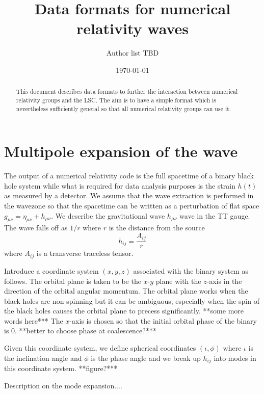 \documentclass[amsmath,amssymb]{article}
\begin{document}
\title{Data formats for numerical relativity waves}
\date{\today}
\author{Author list TBD}
\maketitle

\begin{abstract}
This document describes data formats to further the interaction
between numerical relativity groups and the LSC. The aim is to have a
simple format which is nevertheless sufficiently general so that all
numerical relativity groups can use it.  
\end{abstract}

\section{Multipole expansion of the wave}
\label{sec:multipoles}

The output of a numerical relativity code is the full spacetime of a
binary black hole system while what is required for data analysis
purposes is the strain $h(t)$ as measured by a detector.  We assume
that the wave extraction is performed in the wavezone so that the
spacetime can be written as a perturbation of flat space $g_{\mu\nu} =
\eta_{\mu\nu} + h_{\mu\nu}$.  We describe the gravitational wave
$h_{\mu\nu}$ wave in the TT gauge.  The wave falls off as $1/r$ where
$r$ is the distance from the source
\begin{equation}
  \label{eq:1}
  h_{ij} = \frac{A_{ij}}{r} 
\end{equation}
where $A_{ij}$ is a transverse traceless tensor.  

Introduce a coordinate system $(x,y,z)$ associated with the binary
system as follows.  The orbital plane is taken to be the $x$-$y$ plane
with the $z$-axis in the direction of the orbital angular momentum.
The orbital plane works when the black holes are non-spinning but it
can be ambiguous, especially when the spin of the black holes causes
the orbital plane to precess significantly.  **some more words here***
The $x$-axis is chosen so that the initial orbital phase of the binary
is 0.  **better to choose phase at coalescence?***

Given this coordinate system, we define spherical coordinates
$(\iota,\phi)$ where $\iota$ is the inclination angle and $\phi$ is
the phase angle and we break up $h_{ij}$ into modes in this coordinate
system. **figure?***

Description on the mode expansion....
\end{document}
